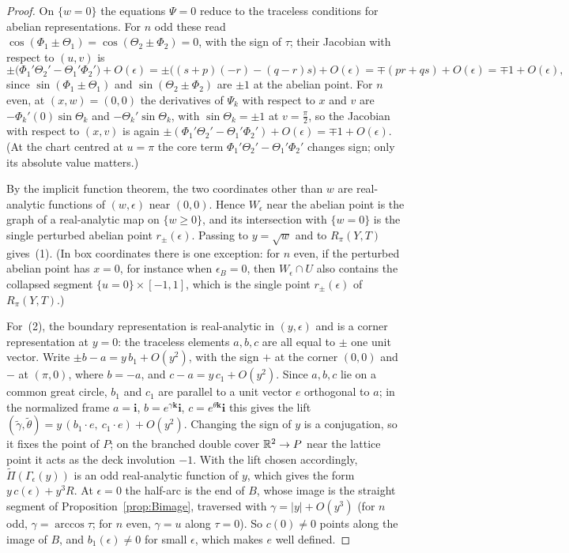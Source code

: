 \begin{proof}
On $\{w=0\}$ the equations $\Psi=0$ reduce to the traceless conditions for abelian representations. For $n$ odd
these read $\cos(\Phi_1\pm\Theta_1)=\cos(\Theta_2\pm\Phi_2)=0$, with the sign of $\tau$; their Jacobian with respect to
$(u,v)$ is
$$\pm\bigl(\Phi_1'\Theta_2'-\Theta_1'\Phi_2'\bigr)+O(\epsilon)=\pm\bigl((s+p)(-r)-(q-r)s\bigr)+O(\epsilon)=\mp(pr+qs)+O(\epsilon)=\mp1+O(\epsilon),$$
since $\sin(\Phi_1\pm\Theta_1)$ and $\sin(\Theta_2\pm\Phi_2)$ are $\pm1$ at the abelian point. For $n$ even, at $(x,w)=(0,0)$
the derivatives of $\Psi_k$ with respect to $x$ and $v$ are $-\Phi_k'(0)\sin\Theta_k$ and $-\Theta_k'\sin\Theta_k$, with
$\sin\Theta_k=\pm1$ at $v=\frac\pi2$, so the Jacobian with respect to $(x,v)$ is again
$\pm(\Phi_1'\Theta_2'-\Theta_1'\Phi_2')+O(\epsilon)=\mp1+O(\epsilon)$. (At the chart centred at $u=\pi$ the core term
$\Phi_1'\Theta_2'-\Theta_1'\Phi_2'$ changes sign; only its absolute value matters.)

By the implicit function theorem, the two coordinates other than $w$ are real-analytic functions of
$(w,\epsilon)$ near $(0,0)$. Hence $W_\epsilon$ near the abelian point is the graph of a real-analytic map on
$\{w\ge0\}$, and its intersection with $\{w=0\}$ is the single perturbed abelian point $r_\pm(\epsilon)$. Passing to
$y=\sqrt w$ and to $R_\pi(Y,T)$ gives~(1). (In box coordinates there is one exception: for $n$ even, if the
perturbed abelian point has $x=0$, for instance when $\epsilon_B=0$, then $W_\epsilon\cap U$ also contains the
collapsed segment $\{u=0\}\times[-1,1]$, which is the single point $r_\pm(\epsilon)$ of $R_\pi(Y,T)$.)

For~(2), the boundary representation is real-analytic in $(y,\epsilon)$ and is a corner representation at
$y=0$: the traceless elements $a,b,c$ are all equal to $\pm$ one unit vector. Write $\pm b-a=y\,b_1+O(y^2)$, with the sign $+$ at the corner $(0,0)$ and $-$ at $(\pi,0)$, where $b=-a$, and
$c-a=y\,c_1+O(y^2)$. Since $a,b,c$ lie on a common great circle, $b_1$ and $c_1$ are parallel to a unit vector $e$
orthogonal to $a$; in the normalized frame $a=\mathbf i$, $b=e^{\gamma\mathbf k}\mathbf i$, $c=e^{\theta\mathbf k}\mathbf i$ this gives the lift
$(\tilde\gamma,\tilde\theta)=y\,(b_1\cdot e,\ c_1\cdot e)+O(y^2)$. Changing the sign of $y$ is a conjugation, so it fixes the
point of $P$; on the branched double cover $\mathbb{R}^2\to P$ near the lattice point it acts as the deck involution
$-1$. With the lift chosen accordingly, $\widetilde\Pi(\Gamma_\epsilon(y))$ is an odd real-analytic function of $y$,
which gives the form $y\,c(\epsilon)+y^3R$. At $\epsilon=0$ the half-arc is the end of $B$, whose image is the
straight segment of Proposition~\ref{prop:Bimage}, traversed with $\gamma=|y|+O(y^3)$ (for $n$ odd, $\gamma=\arccos\tau$;
for $n$ even, $\gamma=u$ along $\tau=0$). So $c(0)\ne0$ points along the image of $B$, and $b_1(\epsilon)\ne0$ for
small $\epsilon$, which makes $e$ well defined.
\end{proof}

